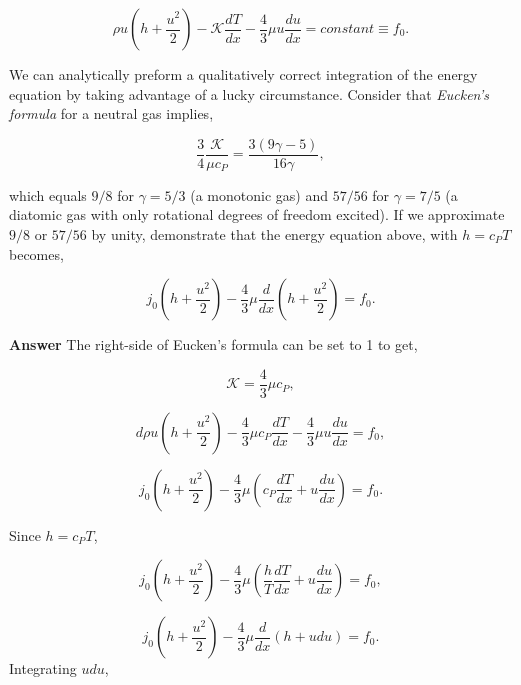 \documentclass[12pt]{article}
\begin{document}
\begin{itemize}
\begin{equation*}
\rho u \left( h + \frac{u^2}{2} \right) - \mathcal{K}\frac{dT}{dx} - \frac{4}{3}\mu u \frac{du}{dx} = constant \equiv f_0.
\end{equation*}

We can analytically preform a qualitatively correct integration of the energy equation by taking advantage of a lucky circumstance. Consider that {\it Eucken's formula} for a neutral gas implies,

\begin{equation*}
\frac{3}{4}\frac{\mathcal{K}}{\mu c_P} = \frac{3(9\gamma -5)}{16\gamma},
\end{equation*}

which equals $9/8$ for $\gamma = 5/3$ (a monotonic gas) and $57/56$ for $\gamma = 7/5$ (a diatomic gas with only rotational degrees of freedom excited). If we approximate $9/8$ or $57/56$ by unity, demonstrate that the energy equation above, with $h=c_PT$ becomes,

\begin{equation*}
j_0\left(h + \frac{u^2}{2}\right) - \frac{4}{3}\mu\frac{d}{dx}\left(h+\frac{u^2}{2}\right) = f_0.
\end{equation*}

\textbf{Answer} The right-side of Eucken's formula can be set to 1 to get,

\begin{equation}
\mathcal{K} = \frac{4}{3}\mu c_P,
\end{equation}

\begin{equation}d
\rho u \left( h + \frac{u^2}{2} \right) -  \frac{4}{3}\mu c_P\frac{dT}{dx} - \frac{4}{3}\mu u \frac{du}{dx} = f_0,
\end{equation}

\begin{equation}
j_0 \left(h + \frac{u^2}{2}\right) - \frac{4}{3}\mu\left(c_P\frac{dT}{dx}  + u \frac{du}{dx}   \right) = f_0.
\end{equation}

Since  $h=c_PT$,

\begin{equation}
j_0 \left(h + \frac{u^2}{2}\right) - \frac{4}{3}\mu\left(\frac{h}{T}\frac{dT}{dx}  + u \frac{du}{dx}   \right) = f_0,
\end{equation}

\begin{equation}
j_0 \left(h + \frac{u^2}{2}\right) - \frac{4}{3}\mu\frac{d}{dx}\left(h  + u du   \right) = f_0.
\end{equation}
 Integrating $udu$, 
 

\end{itemize}
\end{document}
